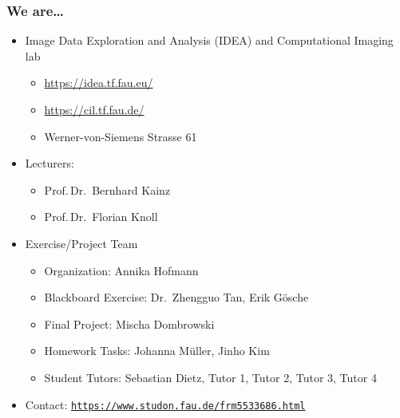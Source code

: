 

\subtitle{Motivation}




\nocite{*}

\frame[plain,c]{\titlepage} %

\begin{frame}
	\frametitle{We are\ldots}
	\begin{itemize}
		\setlength\itemsep{0.3cm}
		\item Image Data Exploration and Analysis (IDEA) and Computational Imaging lab
		\begin{itemize}
			\item \url{https://idea.tf.fau.eu/}
			\item \url{https://cil.tf.fau.de/}
			\item Werner-von-Siemens Strasse 61
		\end{itemize}
		\item Lecturers:
		\begin{itemize}
			\item Prof.\,Dr.\ Bernhard Kainz
			\item Prof.\,Dr.\ Florian Knoll
		\end{itemize}
		\item Exercise/Project Team
		\begin{itemize}
			\item Organization: \tabto{3cm} Annika Hofmann
			\item Blackboard Exercise: \tabto{3cm} Dr.\ Zhengguo Tan, Erik G\"osche
			\item Final Project: \tabto{3cm} Mischa Dombrowski
			\item Homework Tasks: \tabto{3cm} Johanna M\"uller, Jinho Kim
			\item Student Tutors: \tabto{3cm} Sebastian Dietz, Tutor 1, Tutor 2, Tutor 3, Tutor 4
		\end{itemize}
		\item Contact: \texttt{\url{https://www.studon.fau.de/frm5533686.html}}
	\end{itemize}
\end{frame}

